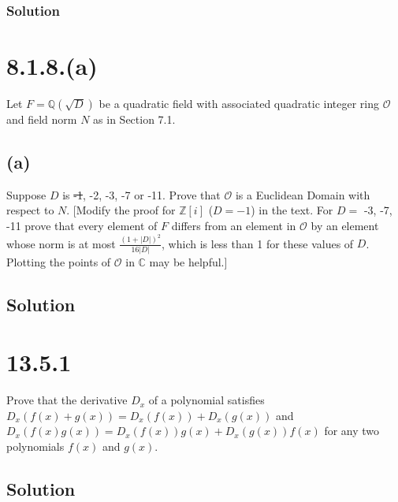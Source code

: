 \documentclass[fleqn]{article}
\begin{document}
            \subsubsection{Solution}
            
    
    \section{8.1.8.(a)}
    Let $F = \mathbb{Q}\left(\sqrt{D}\right)$ be a quadratic field with associated quadratic integer ring $\mathcal{O}$ and field norm $N$ as in Section 7.1.
        
        \subsection{(a)}
        Suppose $D$ is \sout{-1}, -2, -3, -7 or -11.  Prove that $\mathcal{O}$ is a Euclidean Domain with respect to $N$.  [Modify the proof for $\mathbb{Z}[i]$ ($D = -1$) in the text.  For $D = $ -3, -7, -11 prove that every element of $F$ differs from an element in $\mathcal{O}$ by an element whose norm is at most $\frac{(1 + |D|)^2}{16 |D|}$, which is less than 1 for these values of $D$.  Plotting the points of $\mathcal{O}$ in $\mathbb{C}$ may be helpful.]
        
        \subsection{Solution}
        
    
    \section{13.5.1}
    Prove that the derivative $D_x$ of a polynomial satisfies $D_x(f(x) + g(x)) = D_x(f(x)) + D_x(g(x))$ and $D_x(f(x)g(x)) = D_x(f(x))g(x) + D_x(g(x))f(x)$ for any two polynomials $f(x)$ and $g(x)$.
        
        \subsection{Solution}
        
    
\end{document}

